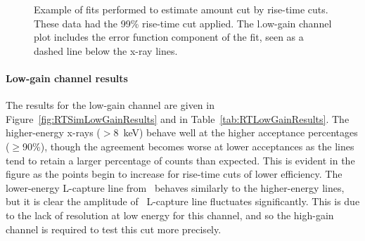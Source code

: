 					\begin{figure}
						\centering
						\def\plotwidth{0.75\textwidth}
						
						\caption[Example of fits performed to estimate amount cut by rise-time cuts]
						{Example of fits performed to estimate amount cut by rise-time cuts.  These data had the 99\% rise-time cut applied.  The l.ow-gain channel 
						plot includes the error function component of the fit, seen as a dashed line below the x-ray lines.}
						\label{fig:BeGeFitExample}
					\end{figure}


					\paragraph{Low-gain channel results}

The results for the low-gain channel are given in Figure~\ref{fig:RTSimLowGainResults} and in Table~\ref{tab:RTLowGainResults}.  The higher-energy x-rays ($>8$~keV) behave well at the higher acceptance percentages ($\ge$90\%), though the agreement becomes worse at lower acceptances as the lines tend to retain a larger percentage of counts than expected.  This is evident in the figure as the points begin to increase for rise-time cuts of lower efficiency.  The lower-energy L-capture line from \gersixeight~behaves similarly to the higher-energy lines, but it is clear the amplitude of \znsixfive~L-capture line fluctuates significantly.  This is due to the lack of resolution at low energy for this channel, and so the high-gain channel is required to test this cut more precisely.  

